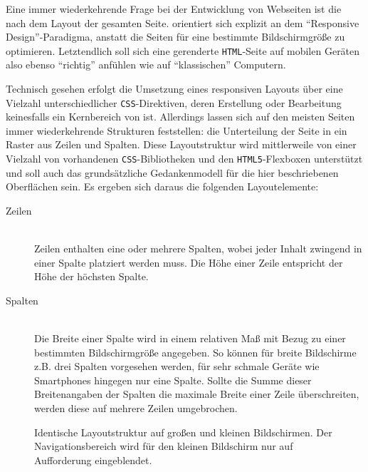Eine immer wiederkehrende Frage bei der Entwicklung von Webseiten ist die nach dem Layout der gesamten Seite. \idename{} orientiert sich explizit an dem "`Responsive Design"'-Paradigma, anstatt die Seiten für eine bestimmte Bildschirmgröße zu optimieren. Letztendlich soll sich eine gerenderte \texttt{HTML}-Seite auf mobilen Geräten also ebenso "`richtig"' anfühlen wie auf "`klassischen"' Computern.

Technisch gesehen erfolgt die Umsetzung eines responsiven Layouts über eine Vielzahl unterschiedlicher \texttt{CSS}-Direktiven, deren Erstellung oder Bearbeitung keinesfalls ein Kernbereich von \idename{} ist. Allerdings lassen sich auf den meisten Seiten immer wiederkehrende Strukturen feststellen: die Unterteilung der Seite in ein Raster aus Zeilen und Spalten. Diese Layoutstruktur wird mittlerweile von einer Vielzahl von vorhandenen \texttt{CSS}-Bib\-lio\-the\-ken und den \texttt{HTML5}-Flex\-boxen unterstützt und soll auch das grundsätzliche Gedankenmodell für die hier beschriebenen Oberflächen sein. Es ergeben sich daraus die folgenden Layoutelemente:

\begin{description}
\item[Zeilen] \hfill \\
  Zeilen enthalten eine oder mehrere Spalten, wobei jeder Inhalt zwingend in einer Spalte platziert werden muss. Die Höhe einer Zeile entspricht der Höhe der höchsten Spalte.
\item[Spalten] \hfill \\
  Die Breite einer Spalte wird in einem relativen Maß mit Bezug zu einer bestimmten Bildschirmgröße angegeben. So können für breite Bildschirme z.B. drei Spalten vorgesehen werden, für sehr schmale Geräte wie Smartphones hingegen nur eine Spalte. Sollte die Summe dieser Breitenangaben der Spalten die maximale Breite einer Zeile überschreiten, werden diese auf mehrere Zeilen umgebrochen.
\end{description}

\begin{figure}[h]
  \begin{center}
  \end{center}
  \caption{Identische Layoutstruktur auf großen und kleinen Bildschirmen. Der Navigationsbereich wird für den kleinen Bildschirm nur auf Aufforderung eingeblendet.}
  \label{fig:grid-example}
\end{figure}


